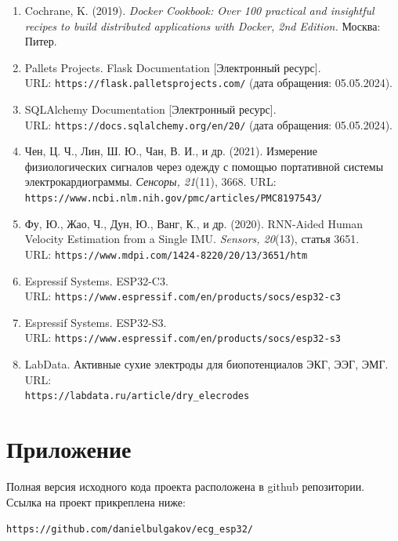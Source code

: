 \documentclass[12pt, russian]{extarticle}
\begin{document}
\begin{spacing}{1.5}
\begin{enumerate}
    \item Cochrane, K. (2019). \textit{Docker Cookbook: Over 100 practical and insightful recipes to build distributed applications with Docker, 2nd Edition.} Москва: Питер.
    
    \item Pallets Projects. Flask Documentation [Электронный ресурс]. \\ URL: \texttt{https://flask.palletsprojects.com/} (дата обращения: 05.05.2024).
    
    \item SQLAlchemy Documentation [Электронный ресурс]. \\ URL: \texttt{https://docs.sqlalchemy.org/en/20/} (дата обращения: 05.05.2024).
    
    \item Чен, Ц. Ч., Лин, Ш. Ю., Чан, В. И., и др. (2021). Измерение физиологических сигналов через одежду с помощью портативной системы электрокардиограммы. \textit{Сенсоры, 21}(11), 3668. URL: \texttt{https://www.ncbi.nlm.nih.gov/pmc/articles/PMC8197543/}
    
    \item Фу, Ю., Жао, Ч., Дун, Ю., Ванг, К., и др. (2020). RNN-Aided Human Velocity Estimation from a Single IMU. \textit{Sensors, 20}(13), статья 3651. \\ URL: \texttt{https://www.mdpi.com/1424-8220/20/13/3651/htm}
    
    \item Espressif Systems. ESP32-C3. \\ URL: \texttt{https://www.espressif.com/en/products/socs/esp32-c3}
    
    \item Espressif Systems. ESP32-S3. \\ URL: \texttt{https://www.espressif.com/en/products/socs/esp32-s3}
    
    \item LabData. Активные сухие электроды для биопотенциалов ЭКГ, ЭЭГ, ЭМГ. URL: \\
    \texttt{https://labdata.ru/article/dry\_elecrodes}

\end{enumerate}

\newpage
\section{Приложение}

Полная версия исходного кода проекта расположена в github репозитории. Ссылка на проект прикреплена ниже:

\verb|https://github.com/danielbulgakov/ecg_esp32/|

\end{spacing}
\end{document}
